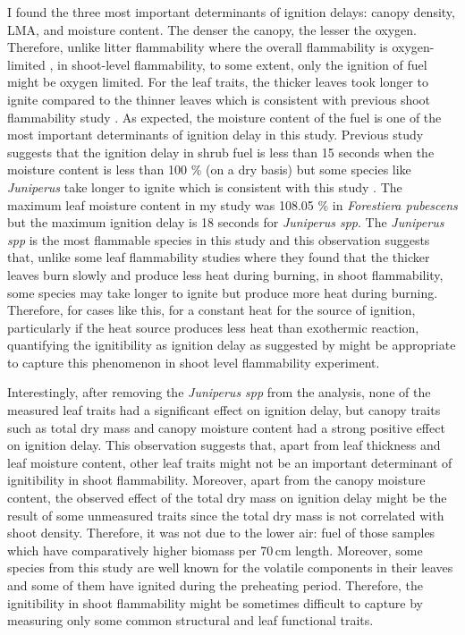\documentclass[12pt]{report}
\begin{document}
I found the three most important determinants of ignition delays: canopy density, LMA, and moisture content. The denser the canopy, the lesser the oxygen. Therefore, unlike litter flammability where the overall flammability is oxygen-limited \citep{schwilk2015dimensions}, in shoot-level flammability, to some extent, only the ignition of fuel might be oxygen limited. For the leaf traits, the thicker leaves took longer to ignite compared to the thinner leaves which is consistent with previous shoot flammability study \citep{alam2020shoot}. As expected, the moisture content of the fuel is one of the most important determinants of ignition delay in this study. Previous study suggests that the ignition delay in shrub fuel is less than 15 seconds when the moisture content is less than 100 \% (on a dry basis) but some species like \emph{Juniperus} take longer to ignite which is consistent with this study \citep{dimitrakopoulos2001flammability,pellizzaro2007seasonal}. The maximum leaf moisture content in my study was 108.05 \% in \emph{Forestiera pubescens} but the maximum ignition delay is 18 seconds for \emph{Juniperus spp}. The \emph{Juniperus spp} is the most flammable species in this study and this observation suggests that, unlike some leaf flammability studies where they found that the thicker leaves burn slowly and produce less heat during burning, in shoot flammability, some species may take longer to ignite but produce more heat during burning. Therefore, for cases like this, for a constant heat for the source of ignition, particularly if the heat source produces less heat than exothermic reaction, quantifying the ignitibility as ignition delay as suggested by \citep{anderson1970forest} might be appropriate to capture this phenomenon in shoot level flammability experiment.

Interestingly, after removing the \emph{Juniperus spp} from the analysis, none of the measured leaf traits had a significant effect on ignition delay, but canopy traits such as total dry mass and canopy moisture content had a strong positive effect on ignition delay. This observation suggests that, apart from leaf thickness and leaf moisture content, other leaf traits might not be an important determinant of ignitibility in shoot flammability. Moreover, apart from the canopy moisture content, the observed effect of the total dry mass on ignition delay might be the result of some unmeasured traits since the total dry mass is not correlated with shoot density. Therefore, it was not due to the lower air: fuel of those samples which have comparatively higher biomass per 70\,cm length. Moreover, some species from this study are well known for the volatile components in their leaves and some of them have ignited during the pre\-heating period. Therefore, the ignitibility in shoot flammability might be sometimes difficult to capture by measuring only some common structural and leaf functional traits.
\end{document}
